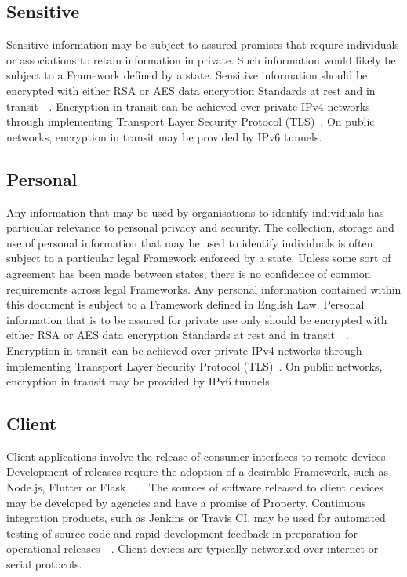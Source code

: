 \documentclass[11pt, oneside]{article}   	%
\begin{document}
\subsection{Sensitive}
Sensitive information may be subject to assured promises that require individuals or associations to retain information in private.
Such information would likely be subject to a Framework defined by a state.
Sensitive information should be encrypted with either RSA or AES data encryption Standards at rest and in transit~\cite{rsa}~\cite{aes}.
Encryption in transit can be achieved over private IPv4 networks through implementing Transport Layer Security Protocol (TLS)~\cite{tlsp}.
On public networks, encryption in transit may be provided by IPv6 tunnels.

\subsection{Personal}
Any information that may be used by organisations to identify individuals has particular relevance to personal privacy and security.
The collection, storage and use of personal information that may be used to identify individuals is often subject to a particular legal Framework enforced by a state.
Unless some sort of agreement has been made between states, there is no confidence of common requirements across legal Frameworks.
Any personal information contained within this document is subject to a Framework defined in English Law.
Personal information that is to be assured for private use only should be encrypted with either RSA or AES data encryption Standards at rest and in transit~\cite{rsa}~\cite{aes}.
Encryption in transit can be achieved over private IPv4 networks through implementing Transport Layer Security Protocol (TLS)~\cite{tlsp}.
On public networks, encryption in transit may be provided by IPv6 tunnels.

\subsection{Client}
Client applications involve the release of consumer interfaces to remote devices.
Development of releases require the adoption of a desirable Framework, such as Node.js, Flutter or Flask~\cite{node}~\cite{flutter}~\cite{flask}.
The sources of software released to client devices may be developed by agencies and have a promise of Property.
Continuous integration products, such as Jenkins or Travis CI, may be used for automated testing of source code and rapid development feedback in preparation for operational releases~\cite{jenkins}~\cite{travis}.
Client devices are typically networked over internet or serial protocols.\
\end{document}
